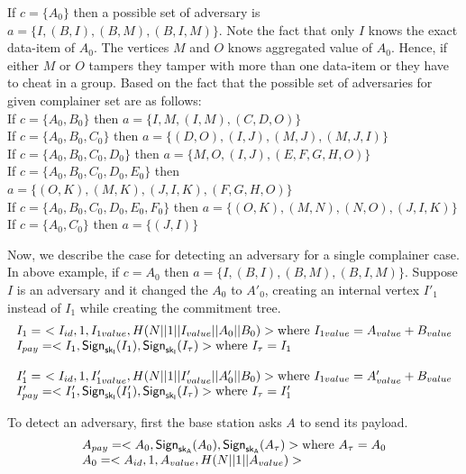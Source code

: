\begin{exmp}
			If $c=\{A_{0}\}$ then a possible set of adversary is $a=\{I,(B,I),(B,M),(B,I,M)\}$. 
			Note the fact that only $I$ knows the exact data-item of $A_{0}$. 
			The vertices $M$ and $O$ knows aggregated value of $A_{0}$. 
			Hence, if either $M$ or $O$ tampers they tamper with more than one data-item or they have to cheat in a group. 
			Based on the fact that the possible set of adversaries for given complainer set are as follows:\\
			If $c=\{A_{0},B_{0}\}$ then $a=\{I,M,(I,M),(C,D,O)\}$\\
			If $c=\{A_{0},B_{0},C_{0}\}$ then $a=\{(D,O),(I,J),(M,J),(M,J,I)\}$\\				
			If $c=\{A_{0},B_{0},C_{0},D_{0}\}$ then $a=\{M, O,(I,J),(E,F,G,H,O)\}$\\			
			If $c=\{A_{0},B_{0},C_{0},D_{0},E_{0}\}$ then $a=\{(O,K),(M,K),(J,I,K),(F,G,H,O)\}$\\				
			If $c=\{A_{0},B_{0},C_{0},D_{0},E_{0},F_{0}\}$ then $a=\{(O,K),(M,N),(N,O),(J,I,K)\}$\\
			If $c=\{A_{0},C_{0}\}$ then $a=\{(J,I)\}$
		\end{exmp}

		Now, we describe the case for detecting an adversary for a single complainer case.
		In above example, if $c = {A_{0}}$ then $a=\{I,(B,I),(B,M),(B,I,M)\}$.
		Suppose $I$ is an adversary and it changed the $A_{0}$ to $A'_{0}$, creating an internal vertex $I'_{1}$ instead of $I_{1}$ while creating the commitment tree.
		\begin{equation*}
			\begin{array}{l}
				I_{1} =\ <I_{id}, 1, I_{1value}, H(N||1||I_{value}||A_{0}||B_{0})> \mbox{where}\ I_{1value} = A_{value} + B_{value}\\	
				I_{pay} = <I_{1}, \textsf{Sign}_{\sf{sk}_{I}}(I_{1}), \textsf{Sign}_{\sf{sk}_{I}}(I_{\tau})> \mbox{where}\ I_{\tau} = I_{1}\\
				\\
				I'_{1} =\ <I_{id}, 1, I'_{1value}, H(N||1||I'_{value}||A'_{0}||B_{0})> \mbox{where}\ I_{1value} = A'_{value} + B_{value}\\
				I'_{pay} = <I'_{1}, \textsf{Sign}_{\sf{sk}_{I}}(I'_{1}), \textsf{Sign}_{\sf{sk}_{I}}(I_{\tau})> \mbox{where}\ I_{\tau} = I'_{1}\\
			\end{array}
		\end{equation*}

		To detect an adversary, first the base station asks $A$ to send its payload.
		\begin{equation*}
			\begin{array}{l}
			A_{pay} = <A_{0}, \textsf{Sign}_{\sf{sk}_{A}}(A_{0}), \textsf{Sign}_{\sf{sk}_{A}}(A_{\tau})> \mbox{where}\ A_{\tau} = A_{0}\\
			A_{0} = <A_{id}, 1, A_{value}, H(N||1||A_{value})>
			\end{array}
		\end{equation*}

